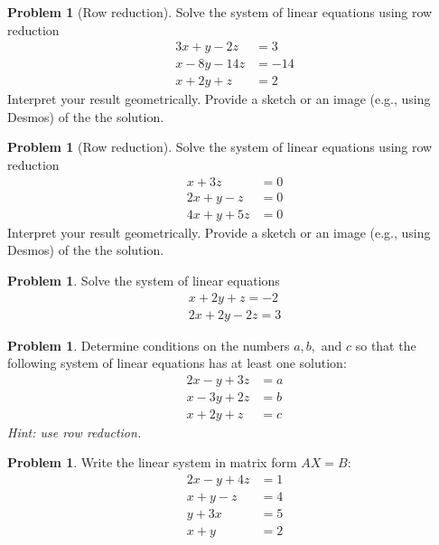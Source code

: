 \documentclass[10pt]{article}
\theoremstyle{definition}
\newtheorem{problem}[theorem]{Problem}
\newcommand{\1}[1]{\textbf{1}_{\left[#1\right]}} %
\begin{document}
\begin{problem}[Row reduction]
  Solve the system of linear equations using row reduction
  \begin{align*}
    3x+y-2z&=3\\
    x-8y-14z&=-14\\
    x+2y+z&=2
  \end{align*}
  Interpret your result geometrically. Provide a sketch or an image (e.g.,
  using Desmos) of the the solution.
\end{problem}


\begin{problem}[Row reduction]
  Solve the system of linear equations using row reduction
  \begin{align*}
    x+3z&=0\\
    2x+y-z&=0\\
    4x+y+5z&=0
  \end{align*}
  Interpret your result geometrically. Provide a sketch or an image (e.g.,
  using Desmos) of the the solution.
\end{problem}

\begin{problem}
  Solve the system of linear equations
  \begin{align*}
    x+2y+z=-2\\
    2x+2y-2z=3
  \end{align*}
\end{problem}

\begin{problem}
  Determine conditions on the numbers $a,b,$ and $c$ so that the following system of linear equations has
  at least one solution:
  \begin{align*}
      2x-y+3z&=a\\
      x-3y+2z&=b\\
      x+2y+z&=c
  \end{align*}
  \textit{Hint: use row reduction.}
\end{problem}

\begin{problem}
  Write the linear system in matrix form $AX=B$:
  \begin{align*}
    2x-y+4z&=1\\ 
    x+y-z&=4\\
    y+3x&=5\\
    x+y&=2
  \end{align*}
\end{problem}
\end{document}
